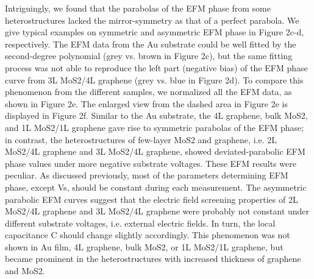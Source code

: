 Intriguingly, we found that the parabolas of the EFM phase from some heterostructures lacked the mirror-symmetry as that of a perfect parabola. We give typical examples on symmetric and asymmetric EFM phase in Figure 2c-d, respectively. The EFM data from the Au substrate could be well fitted by the second-degree polynomial (grey vs. brown in Figure 2c), but the same fitting process was not able to reproduce the left part (negative bias) of the EFM phase curve from 3L MoS2/4L graphene (grey vs. blue in Figure 2d). To compare this phenomenon from the different samples, we normalized all the EFM data, as shown in Figure 2e. The enlarged view from the dashed area in Figure 2e is displayed in Figure 2f. Similar to the Au substrate, the 4L graphene, bulk MoS2, and 1L MoS2/1L graphene gave rise to symmetric parabolas of the EFM phase; in contrast, the heterostructures of few-layer MoS2 and graphene, i.e. 2L MoS2/4L graphene and 3L MoS2/4L graphene, showed deviated-parabolic EFM phase values under more negative substrate voltages. These EFM results were peculiar. As discussed previously, most of the parameters determining EFM phase, except Vs, should be constant during each measurement. The asymmetric parabolic EFM curves suggest that the electric field screening properties of 2L MoS2/4L graphene and 3L MoS2/4L graphene were probably not constant under different substrate voltages, i.e. external electric fields. In turn, the local capacitance C should change slightly accordingly. This phenomenon was not shown in Au film, 4L graphene, bulk MoS2, or 1L MoS2/1L graphene, but became prominent in the heterostructures with increased thickness of graphene and MoS2.

